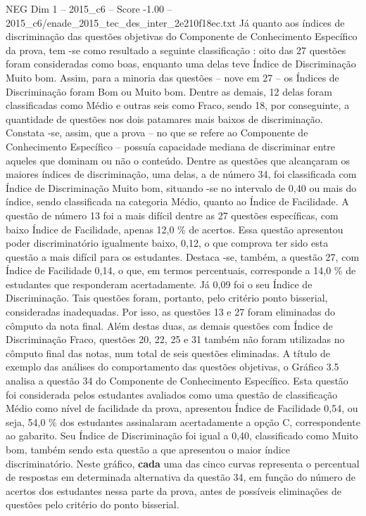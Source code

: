 \begin{textsample}{NEG Dim 1 – 2015\_c6 – Score -1.00 – 2015\_c6/enade\_2015\_tec\_des\_inter\_2e210f18ec.txt}
Já quanto aos índices de discriminação das questões objetivas do Componente de Conhecimento Específico da prova, tem -se como resultado a seguinte classificação : oito das 27 questões foram consideradas como boas, enquanto uma delas teve Índice de Discriminação Muito bom.
Assim, para a minoria das questões – nove em 27 – os Índices de Discriminação foram Bom ou Muito bom.
Dentre as demais, 12 delas foram classificadas como Médio e outras seis como Fraco, sendo 18, por conseguinte, a quantidade de questões nos dois patamares mais baixos de discriminação.
Constata -se, assim, que a prova – no que se refere ao Componente de Conhecimento Específico – possuía capacidade mediana de discriminar entre aqueles que dominam ou não o conteúdo.
Dentre as questões que alcançaram os maiores índices de discriminação, uma delas, a de número 34, foi classificada com Índice de Discriminação Muito bom, situando -se no intervalo de 0,40 ou mais do índice, sendo classificada na categoria Médio, quanto ao Índice de Facilidade.
A questão de número 13 foi a mais difícil dentre as 27 questões específicas, com baixo Índice de Facilidade, apenas 12,0 \% de acertos.
Essa questão apresentou poder discriminatório igualmente baixo, 0,12, o que comprova ter sido esta questão a mais difícil para os estudantes.
Destaca -se, também, a questão 27, com Índice de Facilidade 0,14, o que, em termos percentuais, corresponde a 14,0 \% de estudantes que responderam acertadamente.
Já 0,09 foi o seu Índice de Discriminação.
Tais questões foram, portanto, pelo critério ponto bisserial, consideradas inadequadas.
Por isso, as questões 13 e 27 foram eliminadas do cômputo da nota final.
Além destas duas, as demais questões com Índice de Discriminação Fraco, questões 20, 22, 25 e 31 também não foram utilizadas no cômputo final das notas, num total de seis questões eliminadas.
A título de exemplo das análises do comportamento das questões objetivas, o Gráfico 3.5 analisa a questão 34 do Componente de Conhecimento Específico.
Esta questão foi considerada pelos estudantes avaliados como uma questão de classificação Médio como nível de facilidade da prova, apresentou Índice de Facilidade 0,54, ou seja, 54,0 \% dos estudantes assinalaram acertadamente a opção C, correspondente ao gabarito.
Seu Índice de Discriminação foi igual a 0,40, classificado como Muito bom, também sendo esta questão a que apresentou o maior índice discriminatório.
Neste gráfico, \textbf{cada} uma das cinco curvas representa o percentual de respostas em determinada alternativa da questão 34, em função do número de acertos dos estudantes nessa parte da prova, antes de possíveis eliminações de questões pelo critério do ponto bisserial.

\end{textsample}
